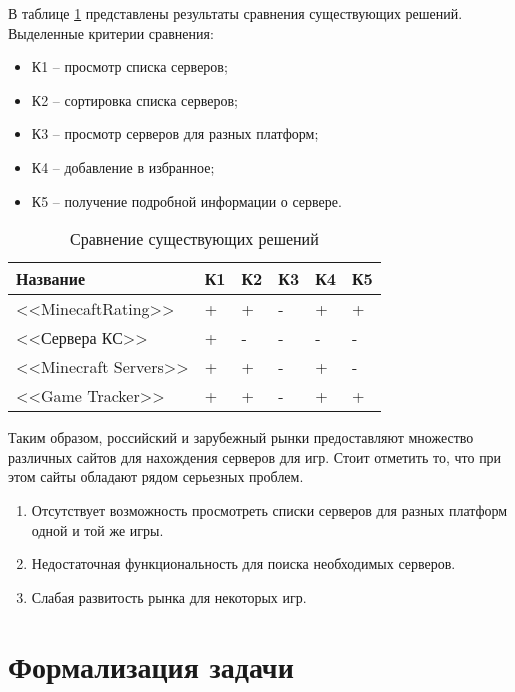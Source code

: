 В таблице \ref{tbl:compare_realizations} представлены результаты сравнения существующих решений. Выделенные критерии сравнения:

\begin{itemize}
    \item К1 -- просмотр списка серверов;
    \item К2 -- сортировка списка серверов;
    \item К3 -- просмотр серверов для разных платформ;
    \item К4 -- добавление в избранное;
    \item К5 -- получение подробной информации о сервере.
\end{itemize}

\captionsetup{justification=raggedleft,singlelinecheck=off}
\begin{table}[H]
    \centering
	\caption{Сравнение существующих решений}
    \label{tbl:compare_realizations}
	\begin{tabular}{|l|l|l|l|l|l|}
        \hline
        \textbf{Название} & \textbf{К1} & \textbf{К2} & \textbf{К3} & \textbf{К4} & \textbf{К5} \\ \hline

        <<MinecaftRating>>      & + & + & - & + & + \\ \hline
        <<Сервера КС>>          & + & - & - & - & - \\ \hline
        <<Minecraft Servers>>   & + & + & - & + & - \\ \hline
        <<Game Tracker>>        & + & + & - & + & + \\ \hline

    \end{tabular}
\end{table}

Таким образом, российский и зарубежный рынки предоставляют множество различных сайтов для нахождения серверов для игр. Стоит отметить то, что при этом сайты обладают рядом серьезных проблем.

\begin{enumerate}
    \item Отсутствует возможность просмотреть списки серверов для разных платформ одной и той же игры.
    \item Недостаточная функциональность для поиска необходимых серверов.
    \item Слабая развитость рынка для некоторых игр.
\end{enumerate}


\section{Формализация задачи}

